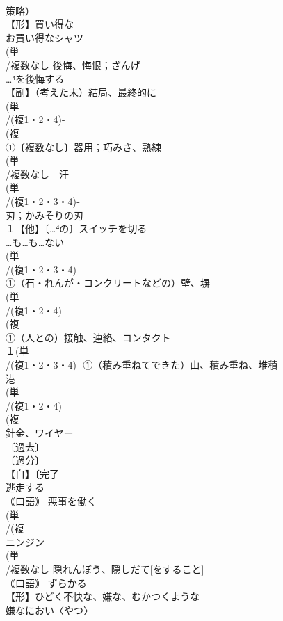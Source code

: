 \documentclass[8pt]{extreport}
\begin{document}
\begin{CJK}{UTF8}{min}
\\	策略）
\\	【形】買い得な 
\\	お買い得なシャツ
\\	(単
\\	/複数なし 後悔、悔恨；ざんげ 
\\	…⁴を後悔する
\\	【副】（考えた末）結局、最終的に
\\	(単
\\	/(複1・2・4)-
\\	(複
\\	①〔複数なし〕器用；巧みさ、熟練 
\\	(単
\\	/複数なし　汗 
\\	(単
\\	/(複1・2・3・4)‐
\\	刃；かみそりの刃 
\\	１【他】〔…⁴の〕スイッチを切る
\\	…も…も…ない 
\\	(単
\\	/(複1・2・3・4)‐
\\	①（石・れんが・コンクリートなどの）壁、塀 
\\	(単
\\	/(複1・2・4)-
\\	(複
\\	①（人との）接触、連絡、コンタクト 
\\	１(単
\\	/(複1・2・3・4)‐ ①（積み重ねてできた）山、積み重ね、堆積 
\\	港 
\\	(単
\\	/(複1・2・4)
\\	(複
\\	針金、ワイヤー 
\\	〔過去〕
\\	〔過分〕
\\	【自】〔完了
\\	逃走する 
\\	｟口語｠ 悪事を働く
\\	(単
\\	/(複
\\	ニンジン 
\\	(単
\\	/複数なし 隠れんぼう、隠しだて[をすること] 
\\	｟口語｠ ずらかる
\\	【形】ひどく不快な、嫌な、むかつくような 
\\	嫌なにおい〈やつ〉

\end{CJK}
\end{document}
